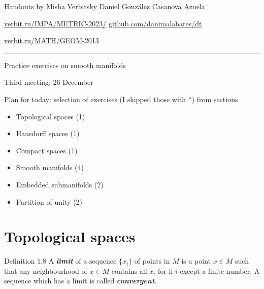 \usepackage{multicol}
%



\begin{minipage}{\textwidth}
	\begin{minipage}{1\textwidth}
	Handouts by Misha Verbitsky	 \hfill Daniel González Casanova Azuela
		
		{\small \href{http://verbit.ru/IMPA/METRIC-2023/}{verbit.ru/IMPA/METRIC-2023/} \hfill\href{https://github.com/danimalabares/dt}{github.com/danimalabares/dt}

		 \href{http://verbit.ru/MATH/GEOM-2013/}{verbit.ru/MATH/GEOM-2013}}
	\end{minipage}
\end{minipage}\vspace{.2cm}\hrule

\vspace{10pt}
{\huge Practice exercises on smooth manifolds}

{\large Third meeting, 26 December}
\vspace{1em}

Plan for today: selection of exercises (I skipped those with *) from sections

\begin{itemize}
\item Topological spaces (1)
\item Hausdorff spaces (1)
\item Compact spaces (1)
\item Smooth manifolds (4)
\item Embedded submanifolds (2)
\item Partition of unity (2)
\end{itemize}

\section{Topological spaces}

\begin{thing3}{Definition 1.8}\leavevmode
	A \textit{\textbf{limit}} of a sequence $\{ x_i\}$ of points in $M$ is a point $x \in M$ such that any neighbourhood of  $x \in M$ contains all $x_i$ for ll $i$ except a finite number. A sequence which has a limit is called \textit{\textbf{convergent}}.
\end{thing3}


